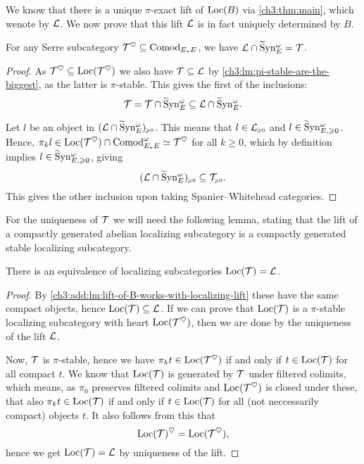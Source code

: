 We know that there is a unique $\pi$-exact lift of $\operatorname{Loc}(B)$ via \cref{ch3:thm:main}, which wenote by $\mathcal{L}$. We now prove that this lift $\mathcal{L}$ is in fact uniquely determined by $B$. 

\begin{lemma}
    \label{ch3:add:lm:lift-of-B-works-with-localizing-lift}
    For any Serre subcategory $\mathcal{T}^\heartsuit\subseteq \mathrm{Comod}_{E_*E}$, we have $\mathcal{L}\cap \widetilde{\mathrm{S}}\mathrm{yn}_{E}^\omega = \mathcal{T}$. 
\end{lemma}
\begin{proof}
    As $\mathcal{T}^\heartsuit \subseteq \operatorname{Loc}(\mathcal{T}^\heartsuit)$ we also have $\mathcal{T} \subseteq \mathcal{L}$ by \cref{ch3:lm:pi-stable-are-the-biggest}, as the latter is $\pi$-stable. This gives the first of the inclusions:
    \[\mathcal{T} = \mathcal{T} \cap \widetilde{\mathrm{S}}\mathrm{yn}_{E}^\omega\subseteq \mathcal{L} \cap \widetilde{\mathrm{S}}\mathrm{yn}_{E}^\omega.\]
    
    Let $l$ be an object in $(\mathcal{L}\cap \widetilde{\mathrm{S}}\mathrm{yn}_{E}^\omega)_{\hspace{-1pt}\scriptscriptstyle\geqslant 0}$. This means that $l\in \mathcal{L}_{\hspace{-1pt}\scriptscriptstyle\geqslant 0}$ and $l \in \widetilde{\mathrm{S}}\mathrm{yn}_{E, \geqslant 0}^\omega$. Hence, $\pi_k l \in \operatorname{Loc}(\mathcal{T}^\heartsuit)\cap \mathrm{Comod}_{E_*E}^\omega \simeq \mathcal{T}^\heartsuit$ for all $k\geq 0$, which by definition implies $l \in \widetilde{\mathrm{S}}\mathrm{yn}_{E, \geqslant 0}^\omega$, giving 
    \[(\mathcal{L}\cap \widetilde{\mathrm{S}}\mathrm{yn}_{E}^\omega)_{\hspace{-1pt}\scriptscriptstyle\geqslant 0} \subseteq \mathcal{T}_{\hspace{-1pt}\scriptscriptstyle\geqslant 0}.\]
    This gives the other inclusion upon taking Spanier--Whitehead categories. 
\end{proof}


For the uniqueness of $\mathcal{T}$ we will need the following lemma, stating that the lift of a compactly generated abelian localizing subcategory is a compactly generated stable localizing subcategory. 

\begin{lemma}
    \label{ch3:add:lm:loc-of-lift-is-localizing-lift}
    There is an equivalence of localizing subcategories $\operatorname{Loc}(\mathcal{T}) = \mathcal{L}$. 
\end{lemma}
\begin{proof}
    By \cref{ch3:add:lm:lift-of-B-works-with-localizing-lift} these have the same compact objects, hence $\operatorname{Loc}(\mathcal{T})\subseteq \mathcal{L}$. If we can prove that $\operatorname{Loc}(\mathcal{T})$ is a $\pi$-stable localizing subcategory with heart $\operatorname{Loc}(\mathcal{T}^\heartsuit)$, then we are done by the uniqueness of the lift $\mathcal{L}$. 

    Now, $\mathcal{T}$ is $\pi$-stable, hence we have $\pi_k t \in \operatorname{Loc}(\mathcal{T}^\heartsuit)$ if and only if $t\in \operatorname{Loc}(\mathcal{T})$ for all compact $t$. We know that $\operatorname{Loc}(\mathcal{T})$ is generated by $\mathcal{T}$ under filtered colimits, which means, as $\pi_0$ preserves filtered colimits and $\operatorname{Loc}(\mathcal{T}^\heartsuit)$ is closed under these, that also $\pi_k t\in \operatorname{Loc}(\mathcal{T})$ if and only if $t\in \operatorname{Loc}(\mathcal{T})$ for all (not neccessarily compact) objects $t$. It also follows from this that 
    \[\operatorname{Loc}(\mathcal{T})^\heartsuit = \operatorname{Loc}(\mathcal{T}^\heartsuit),\]
    hence we get $\operatorname{Loc}(\mathcal{T}) = \mathcal{L}$ by uniqueness of the lift. 
\end{proof}

